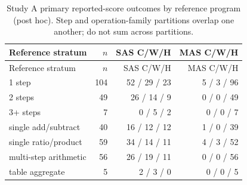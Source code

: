 {\small\setlength{\tabcolsep}{3pt}\begin{longtable}{lrrr}
\caption{Study A primary reported-score outcomes by reference program (post hoc). Step and operation-family partitions overlap one another; do not sum across partitions.}\label{tab:strata}\\
Reference stratum & $n$ & SAS C/W/H & MAS C/W/H\\\toprule\endfirsthead
Reference stratum & $n$ & SAS C/W/H & MAS C/W/H\\\toprule\endhead
1 step & 104 & 52 / 29 / 23 & 5 / 3 / 96\\
2 steps & 49 & 26 / 14 / 9 & 0 / 0 / 49\\
3+ steps & 7 & 0 / 5 / 2 & 0 / 0 / 7\\
single add/subtract & 40 & 16 / 12 / 12 & 1 / 0 / 39\\
single ratio/product & 59 & 34 / 14 / 11 & 4 / 3 / 52\\
multi-step arithmetic & 56 & 26 / 19 / 11 & 0 / 0 / 56\\
table aggregate & 5 & 2 / 3 / 0 & 0 / 0 / 5\\
\bottomrule\end{longtable}}